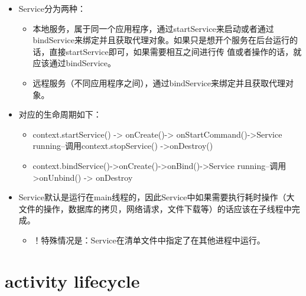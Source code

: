 \documentclass[9pt, b5paaper]{book}
\begin{document}
\begin{itemize}
\item Service分为两种：
\begin{itemize}
\item 本地服务，属于同一个应用程序，通过startService来启动或者通过bindService来绑定并且获取代理对象。如果只是想开个服务在后台运行的话，直接startService即可，如果需要相互之间进行传 值或者操作的话，就应该通过bindService。
\item 远程服务（不同应用程序之间），通过bindService来绑定并且获取代理对象。
\end{itemize}
\item 对应的生命周期如下： 
\begin{itemize}
\item context.startService() -> onCreate()-> onStartCommand()->Service running--调用context.stopService() ->onDestroy()
\item context.bindService()->onCreate()->onBind()->Service running--调用>onUnbind() -> onDestroy
\end{itemize}
\item Service默认是运行在main线程的，因此Service中如果需要执行耗时操作（大文件的操作，数据库的拷贝，网络请求，文件下载等）的话应该在子线程中完成。
\begin{itemize}
\item ！特殊情况是：Service在清单文件中指定了在其他进程中运行。
\end{itemize}
\end{itemize}

\chapter{activity lifecycle}
\label{sec-7}
\end{document}
